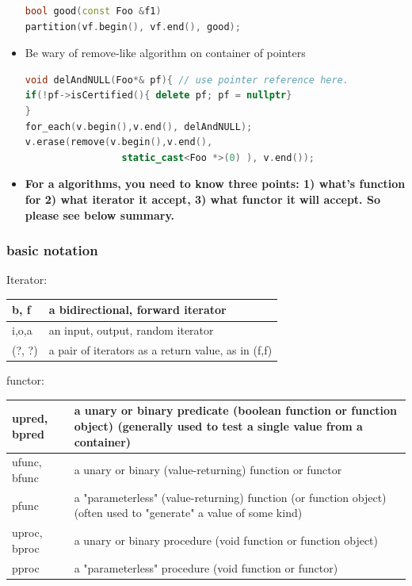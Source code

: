 \documentclass[a4paper,12pt,twoside]{book}
\begin{document}
\begin{itemize}
\begin{lstlisting}[frame=single, language=c++]
bool good(const Foo &f1)
partition(vf.begin(), vf.end(), good);
\end{lstlisting}

\item Be wary of remove-like algorithm on container of pointers
\begin{lstlisting}[frame=single, language=c++]
void delAndNULL(Foo*& pf){ // use pointer reference here.
if(!pf->isCertified(){ delete pf; pf = nullptr}
}
for_each(v.begin(),v.end(), delAndNULL);
v.erase(remove(v.begin(),v.end(),
                 static_cast<Foo *>(0) ), v.end());
\end{lstlisting}


\item \textbf{For a algorithms, you need to know three points: 1) what's function  for 2) what iterator it accept, 3) what functor it will accept.  So please see below summary. }
\end{itemize}

\subsubsection{basic notation}



Iterator:  \\
\begin{tabular}{| p{} |p{}|}
\hline b, f &	a bidirectional, forward iterator \\
\hline i,o,a 	&an input, output, random iterator  \\
\hline(?, ?)	&a pair of iterators as a return value, as in (f,f)  \\
\hline
\end{tabular}

functor:  \\
\begin{tabular}{| p{} |p{}|}
\hline upred, bpred	& a unary or binary predicate (boolean function or function object)
(generally used to test a single value from a container) \\

\hline ufunc, bfunc	&  a unary or binary  (value-returning) function or functor \\
\hline pfunc	& a "parameterless" (value-returning) function (or function object)
(often used to "generate" a value of some kind) \\
\hline uproc, bproc	& a unary or binary  procedure (void function or function object) \\
\hline pproc	&  a "parameterless" procedure (void function or functor) \\
\hline
\end{tabular}
\end{document}
